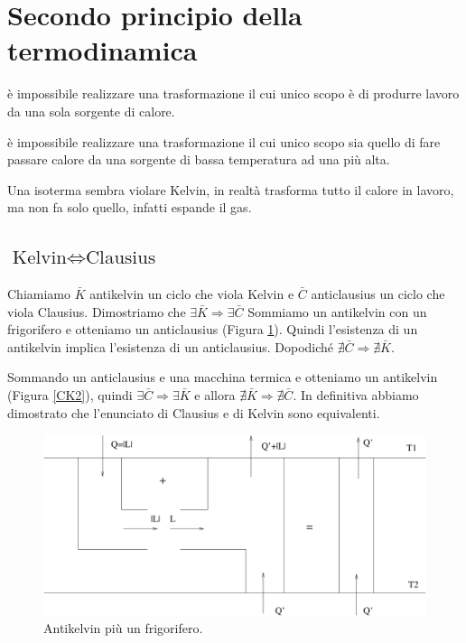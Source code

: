 \section{Secondo principio della termodinamica}

\begin{Pri}
   è impossibile realizzare una trasformazione il cui unico scopo è di produrre lavoro da una sola sorgente di calore.
\end{Pri}

\begin{Pri}
   è impossibile realizzare una trasformazione il cui unico scopo sia quello di fare passare calore da una sorgente di bassa temperatura ad una più alta.
\end{Pri}

Una isoterma sembra violare Kelvin, in realtà trasforma tutto il calore in lavoro, ma non fa solo quello, infatti espande il gas.
\subsection{\texorpdfstring{$\text{Kelvin}\Leftrightarrow\text{Clausius}$}{Kelvin <=> Clausius}}

Chiamiamo $\bar{K}$ antikelvin un ciclo che viola Kelvin e $\bar{C}$ anticlausius un ciclo che viola Clausius. Dimostriamo che $\exists\bar{K}\Rightarrow\exists\bar{C}$ Sommiamo un antikelvin con un frigorifero e otteniamo un anticlausius (Figura \ref{CK1}). Quindi l'esistenza di un antikelvin implica l'esistenza di un anticlausius. Dopodiché $\nexists\bar{C}\Rightarrow\nexists\bar{K}$.

Sommando un anticlausius e una macchina termica e otteniamo un antikelvin (Figura \ref{CK2}), quindi
$\exists\bar{C}\Rightarrow\exists\bar{K}$ e allora $\nexists\bar{K}\Rightarrow\nexists\bar{C}$. In definitiva abbiamo dimostrato che l'enunciato di Clausius e di Kelvin sono equivalenti.
\begin{figure}[htbp]
   \centering
   \includegraphics[scale=0.5]{immagini/fisica1/AK+Frigo}
   \caption{Antikelvin più un frigorifero.}
   \label{CK1}
\end{figure}

